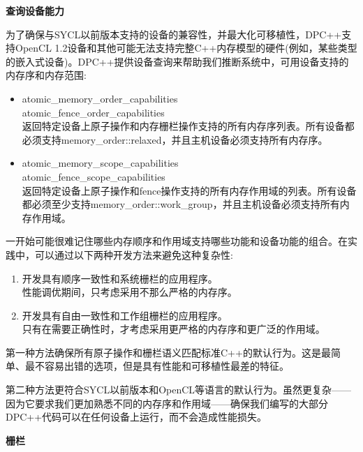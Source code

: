 \hspace*{\fill} \par %
\textbf{查询设备能力}

为了确保与SYCL以前版本支持的设备的兼容性，并最大化可移植性，DPC++支持OpenCL 1.2设备和其他可能无法支持完整C++内存模型的硬件(例如，某些类型的嵌入式设备)。DPC++提供设备查询来帮助我们推断系统中，可用设备支持的内存序和内存范围:\par

\begin{itemize}
	\item atomic\_memory\_order\_capabilities \\
	atomic\_fence\_order\_capabilities \\
	返回特定设备上原子操作和内存栅栏操作支持的所有内存序列表。所有设备都必须支持memory\_order::relaxed，并且主机设备必须支持所有内存序。
	\item atomic\_memory\_scope\_capabilities \\
	atomic\_fence\_scope\_capabilities \\
	返回特定设备上原子操作和fence操作支持的所有内存作用域的列表。所有设备都必须至少支持memory\_order::work\_group，并且主机设备必须支持所有内存作用域。
\end{itemize}

一开始可能很难记住哪些内存顺序和作用域支持哪些功能和设备功能的组合。在实践中，可以通过以下两种开发方法来避免这种复杂性:\par

\begin{enumerate}
	\item 开发具有顺序一致性和系统栅栏的应用程序。\\
	性能调优期间，只考虑采用不那么严格的内存序。
	\item 开发具有自由一致性和工作组栅栏的应用程序。 \\
	只有在需要正确性时，才考虑采用更严格的内存序和更广泛的作用域。
\end{enumerate}

第一种方法确保所有原子操作和栅栏语义匹配标准C++的默认行为。这是最简单、最不容易出错的选项，但是具有性能和可移植性最差的特征。\par

第二种方法更符合SYCL以前版本和OpenCL等语言的默认行为。虽然更复杂——因为它要求我们更加熟悉不同的内存序和作用域——确保我们编写的大部分DPC++代码可以在任何设备上运行，而不会造成性能损失。\par

\hspace*{\fill} \par %
\textbf{栅栏}

